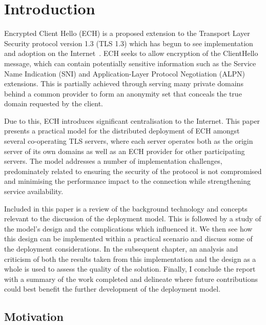 \chapter{Introduction}\label{Introduction}

Encrypted Client Hello (ECH) is a proposed extension to the Transport Layer Security protocol version 1.3 (TLS 1.3) which has begun to see implementation and adoption on the Internet~\cite{tsiatsikas2022measuring, CF-ECH}. ECH seeks to allow encryption of the ClientHello message, which can contain potentially sensitive information such as the Service Name Indication (SNI) and Application-Layer Protocol Negotiation (ALPN) extensions. This is partially achieved through serving many private domains behind a common provider to form an anonymity set that conceals the true domain requested by the client.

Due to this, ECH introduces significant centralisation to the Internet. This paper presents a practical model for the distributed deployment of ECH amongst several co-operating TLS servers, where each server operates both as the origin server of its own domains as well as an ECH provider for other participating servers. The model addresses a number of implementation challenges, predominately related to ensuring the security of the protocol is not compromised and minimising the performance impact to the connection while strengthening service availability.

Included in this paper is a review of the background technology and concepts relevant to the discussion of the deployment model. This is followed by a study of the model's design and the complications which influenced it. We then see how this design can be implemented within a practical scenario and discuss some of the deployment considerations. In the subsequent chapter, an analysis and criticism of both the results taken from this implementation and the design as a whole is used to assess the quality of the solution. Finally, I conclude the report with a summary of the work completed and delineate where future contributions could best benefit the further development of the deployment model.









\section{Motivation}

